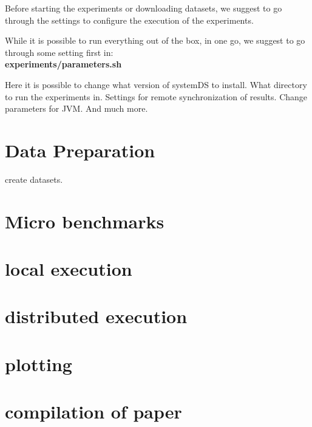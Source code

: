 \documentclass{readme}
\begin{document}
Before starting the experiments or downloading datasets,
we suggest to go through the settings to configure the execution of the experiments.

While it is possible to run everything out of the box, in one go,
we suggest to go through some setting first in: \\
\textbf{experiments/parameters.sh}

Here it is possible to change what version of systemDS to install.
What directory to run the experiments in.
Settings for remote synchronization of results.
Change parameters for JVM.
And much more.




\section{Data Preparation}

create datasets.

\section{Micro benchmarks}



\section{local execution}

\section{distributed execution}

\section{plotting}

\section{compilation of paper}
\end{document}
